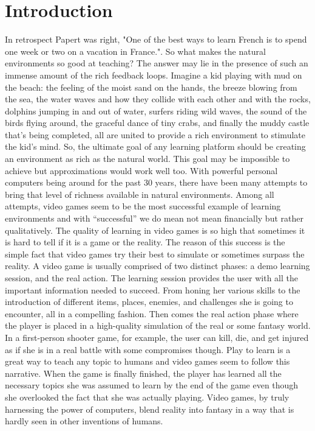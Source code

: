 \documentclass[12pt, a4paper]{article}
\begin{document}
\section*{Introduction}
In retrospect Papert was right, "One of the best ways to learn French is to spend one week or two on a vacation in France."\cite{papert}. So what makes the natural environments so good at teaching? The answer may lie in the presence of such an immense amount of the rich feedback loops. Imagine a kid playing with mud on the beach: the feeling of the moist sand on the hands, the breeze blowing from the sea, the water waves and how they collide with each other and with the rocks, dolphins jumping in and out of water, surfers riding wild waves, the sound of the birds flying around, the graceful dance of tiny crabs, and finally the muddy castle that's being completed, all are united to provide a rich environment to stimulate the kid's mind. So, the ultimate goal of any learning platform should be creating an environment as rich as the natural world. This goal may be impossible to achieve but approximations would work well too. With powerful personal computers being around for the past 30 years, there have been many attempts to bring that level of richness available in natural environments. Among all attempts, video games seem to be the most successful example of learning environments and with “successful” we do mean not mean financially but rather qualitatively. The quality of learning in video games is so high that sometimes it is hard to tell if it is a game or the reality. The reason of this success is the simple fact that video games try their best to simulate or sometimes surpass the reality. A video game is usually comprised of two distinct phases: a demo learning session, and the real action. The learning session provides the user with all the important information needed to succeed. From honing her various skills to the introduction of different items, places, enemies, and challenges she is going to encounter, all in a compelling fashion. Then comes the real action phase where the player is placed in a high-quality simulation of the real or some fantasy world. In a first-person shooter game, for example, the user can kill, die, and get injured as if she is in a real battle with some compromises though. Play to learn is a great way to teach any topic to humans and video games seem to follow this narrative. When the game is finally finished, the player has learned all the necessary topics she was assumed to learn by the end of the game even though she overlooked the fact that she was actually playing. Video games, by truly harnessing the power of computers, blend reality into fantasy in a way that is hardly seen in other inventions of humans.
\end{document}
